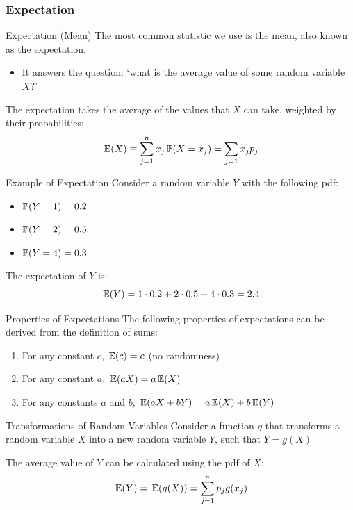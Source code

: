 \documentclass[aspectratio=169,t,11pt,table]{beamer}
\begin{document}
\subsubsection*{Expectation}

\begin{frame}{Expectation (Mean)}
  The most common statistic we use is the mean, also known as the \alert{expectation}.
  \begin{itemize}
    \item It answers the question: `what is the average value of some random variable $X$?'
  \end{itemize}
  
  \bigskip 
  The expectation takes the average of the values that $X$ can take, weighted by their probabilities:
  \[
    \expec{X} \equiv \sum_{j=1}^n x_j \P(X = x_j) = \sum_{j=1} x_j p_j
  \]
\end{frame}

\begin{frame}{Example of Expectation}
  Consider a random variable $Y$ with the following pdf:
  \begin{itemize}
    \item $\P(Y = 1) = 0.2$
    \item $\P(Y = 2) = 0.5$
    \item $\P(Y = 4) = 0.3$
  \end{itemize}
  
  \bigskip
  The expectation of $Y$ is:
  \[
    \expec{Y} = 1 \cdot 0.2 + 2 \cdot 0.5 + 4 \cdot 0.3 = 2.4
  \]
\end{frame}

\begin{frame}{Properties of Expectations}
  The following properties of expectations can be derived from the definition of sums:
  \begin{enumerate}
    \item For any constant $c$, $\expec{c} = c$ (no randomness)
    \item For any constant $a$, $\expec{aX} = a \expec{X}$
    \item For any constants $a$ and $b$, $\expec{aX + bY} = a \expec{X} + b \expec{Y}$
  \end{enumerate}
\end{frame}

\begin{frame}{Transformations of Random Variables}
  Consider a function $g$ that transforms a random variable $X$ into a new random variable $Y$, such that $Y = g(X)$
  
  \bigskip 
  The average value of $Y$ can be calculated using the pdf of $X$:
  \[
    \expec{Y} = \expec{g(X)} = \sum_{j=1}^n p_j g(x_j)
  \]
\end{frame}
\end{document}
